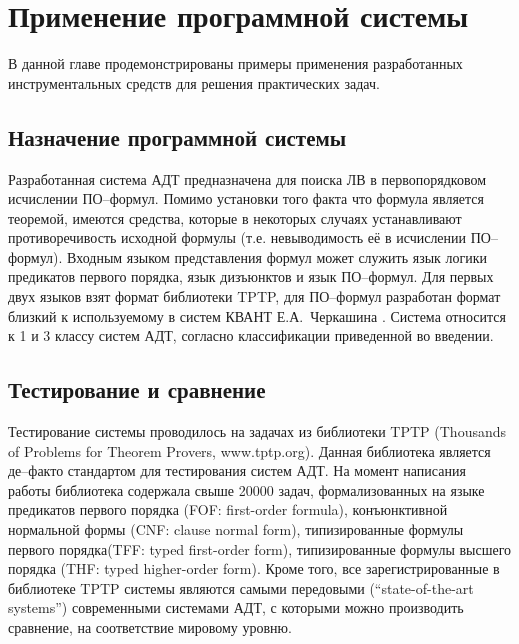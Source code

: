 \chapter{Применение программной системы}
\label{part:examples}

В данной главе продемонстрированы примеры применения разработанных инструментальных средств  для решения практических задач. 

\section{Назначение программной системы}
Разработанная система АДТ предназначена для поиска ЛВ в первопорядковом исчислении ПО--формул. Помимо установки того факта что формула является теоремой, имеются средства, которые в некоторых случаях устанавливают противоречивость исходной формулы (т.е. невыводимость её в исчислении ПО--формул). Входным языком представления формул может служить язык логики предикатов первого порядка, язык дизъюнктов и язык ПО--формул. Для первых двух языков взят формат библиотеки TPTP, для ПО--формул разработан формат близкий к используемому в систем КВАНТ Е.А.~Черкашина \cite{dissChe}. Система относится к 1 и 3 классу систем АДТ, согласно классификации приведенной во введении.




\section{Тестирование и сравнение}

Тестирование системы проводилось на задачах из библиотеки TPTP (Thousands of Problems for Theorem Provers, www.tptp.org). Данная библиотека является де--факто стандартом для тестирования систем АДТ. На момент написания работы библиотека содержала свыше 20000 задач, формализованных на языке предикатов первого порядка (FOF: first-order formula), конъюнктивной нормальной формы (CNF: clause normal form), типизированные формулы первого порядка(TFF: typed first-order form), типизированные формулы высшего порядка (THF: typed higher-order form). Кроме того, все зарегистрированные в библиотеке TPTP системы являются самыми передовыми (``state-of-the-art systems'') современными системами АДТ, с которыми можно производить сравнение, на соответствие мировому уровню.

